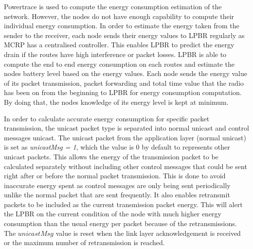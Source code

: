 Powertrace is used to compute the energy consumption estimation of the network. However, the nodes do not have enough capability to compute their individual energy consumption. In order to estimate the energy taken from the sender to the receiver, each node sends their energy values to LPBR regularly as MCRP has a centralised controller. This enables LPBR to predict the energy drain if the routes have high interference or packet losses. LPBR is able to compute the end to end energy consumption on each routes and estimate the nodes battery level based on the energy values. Each node sends the energy value of its packet transmission, packet forwarding and total time value that the radio has been on from the beginning to LPBR for energy consumption computation.
By doing that, the nodes knowledge of its energy level is kept at minimum. 


In order to calculate accurate energy consumption for specific packet transmission, the unicast packet type is separated into normal unicast and control messages unicast. The unicast packet from the application layer (normal unicast) is set as \textit{unicastMsg = 1}, which the value is 0 by default to represents other unicast packets. This allows the energy of the transmission packet to be calculated separately without including other control messages that could be sent right after or before the normal packet transmission. This is done to avoid inaccurate energy spent as control messages are only being sent periodically unlike the normal packet that are sent frequently. It also enables retransmit packets to be included as the current transmission packet energy. This will alert the LPBR on the current condition of the node with much higher energy consumption than the usual energy per packet because of the retransmissions. The $unicastMsg$ value is reset when the link layer acknowledgement is received or the maximum number of retransmission is reached. 


